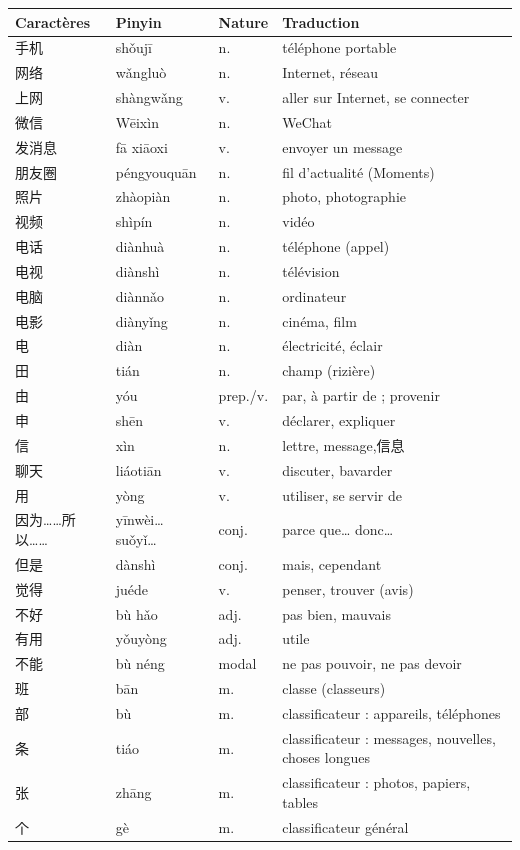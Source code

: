 \documentclass[11pt]{article}
\begin{document}
\begin{center}
\begin{tabularx}{\linewidth}{|X|X|X|X|}
\hline
\rowcolor{popblueL} \textbf{Caractères} & \textbf{Pinyin} & \textbf{Nature} & \textbf{Traduction} \\
\hline
手机 & shǒujī & n. & téléphone portable \\
网络 & wǎngluò & n. & Internet, réseau \\
上网 & shàngwǎng & v. & aller sur Internet, se connecter \\
微信 & Wēixìn & n. & WeChat \\
发消息 & fā xiāoxi & v. & envoyer un message \\
朋友圈 & péngyouquān & n. & fil d'actualité (Moments) \\
照片 & zhàopiàn & n. & photo, photographie \\
视频 & shìpín & n. & vidéo \\
电话 & diànhuà & n. & téléphone (appel) \\
电视 & diànshì & n. & télévision \\
电脑 & diànnǎo & n. & ordinateur \\
电影 & diànyǐng & n. & cinéma, film \\
电 & diàn & n. & électricité, éclair \\
田 & tián & n. & champ (rizière) \\
由 & yóu & prep./v. & par, à partir de ; provenir \\
申 & shēn & v. & déclarer, expliquer \\
信 & xìn & n. & lettre, message,信息 \\
聊天 & liáotiān & v. & discuter, bavarder \\
用 & yòng & v. & utiliser, se servir de \\
因为……所以…… & yīnwèi… suǒyǐ… & conj. & parce que… donc… \\
但是 & dànshì & conj. & mais, cependant \\
觉得 & juéde & v. & penser, trouver (avis) \\
不好 & bù hǎo & adj. & pas bien, mauvais \\
有用 & yǒuyòng & adj. & utile \\
不能 & bù néng & modal & ne pas pouvoir, ne pas devoir \\
班 & bān & m. & classe (classeurs) \\
部 & bù & m. & classificateur : appareils, téléphones \\
条 & tiáo & m. & classificateur : messages, nouvelles, choses longues \\
张 & zhāng & m. & classificateur : photos, papiers, tables \\
个 & gè & m. & classificateur général \\
\hline
\end{tabularx}
\end{center}
\end{document}
